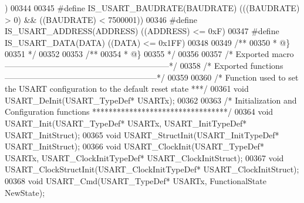\begin{DoxyCode}
{      )}
00344 
00345 \textcolor{preprocessor}{#}\textcolor{preprocessor}{define} \textcolor{preprocessor}{IS\_USART\_BAUDRATE}\textcolor{preprocessor}{(}\textcolor{preprocessor}{BAUDRATE}\textcolor{preprocessor}{)} \textcolor{preprocessor}{(}\textcolor{preprocessor}{(}\textcolor{preprocessor}{(}\textcolor{preprocessor}{BAUDRATE}\textcolor{preprocessor}{)} \textcolor{preprocessor}{>} 0\textcolor{preprocessor}{)} \textcolor{preprocessor}{&&} \textcolor{preprocessor}{(}\textcolor{preprocessor}{(}\textcolor{preprocessor}{BAUDRATE}\textcolor{preprocessor}{)} \textcolor{preprocessor}{<} 7500001\textcolor{preprocessor}{)}\textcolor{preprocessor}{)}
00346 \textcolor{preprocessor}{#}\textcolor{preprocessor}{define} \textcolor{preprocessor}{IS\_USART\_ADDRESS}\textcolor{preprocessor}{(}\textcolor{preprocessor}{ADDRESS}\textcolor{preprocessor}{)} \textcolor{preprocessor}{(}\textcolor{preprocessor}{(}\textcolor{preprocessor}{ADDRESS}\textcolor{preprocessor}{)} \textcolor{preprocessor}{<=} 0xF\textcolor{preprocessor}{)}
00347 \textcolor{preprocessor}{#}\textcolor{preprocessor}{define} \textcolor{preprocessor}{IS\_USART\_DATA}\textcolor{preprocessor}{(}\textcolor{preprocessor}{DATA}\textcolor{preprocessor}{)} \textcolor{preprocessor}{(}\textcolor{preprocessor}{(}\textcolor{preprocessor}{DATA}\textcolor{preprocessor}{)} \textcolor{preprocessor}{<=} 0x1FF\textcolor{preprocessor}{)}
00348 
00349 \textcolor{comment}{/**}
00350 \textcolor{comment}{  * @\}}
00351 \textcolor{comment}{  */}
00352 
00353 \textcolor{comment}{/**}
00354 \textcolor{comment}{  * @\}}
00355 \textcolor{comment}{  */}
00356 
00357 \textcolor{comment}{/* Exported macro ------------------------------------------------------------*/}
00358 \textcolor{comment}{/* Exported functions --------------------------------------------------------*/}
00359 
00360 \textcolor{comment}{/*  Function used to set the USART configuration to the default reset state ***/}
00361 \textcolor{keywordtype}{void} USART_DeInit(USART\_TypeDef* USARTx);
00362 
00363 \textcolor{comment}{/* Initialization and Configuration functions *********************************/}
00364 \textcolor{keywordtype}{void} USART_Init(USART\_TypeDef* USARTx, USART\_InitTypeDef* USART\_InitStruct);
00365 \textcolor{keywordtype}{void} USART_StructInit(USART\_InitTypeDef* USART\_InitStruct);
00366 \textcolor{keywordtype}{void} USART_ClockInit(USART\_TypeDef* USARTx, USART\_ClockInitTypeDef* USART\_ClockInitStruct);
00367 \textcolor{keywordtype}{void} USART_ClockStructInit(USART\_ClockInitTypeDef* USART\_ClockInitStruct);
00368 \textcolor{keywordtype}{void} USART_Cmd(USART\_TypeDef* USARTx, FunctionalState NewState);

\end{DoxyCode}
